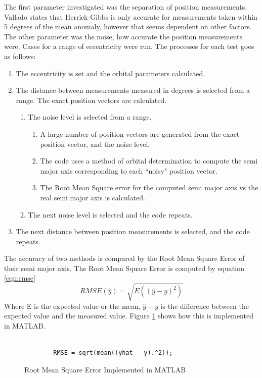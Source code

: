 \documentclass[12pt]{article}
\begin{document}
	The first parameter investigated was the separation of position measurements.  Vallado\cite{vallado2007fundamentals} states that Herrick-Gibbs is only accurate for measurements taken within 5 degrees of the mean anomaly, however that seems dependent on other factors. The other parameter was the noise, how accurate the position measurements were. Cases for a range of eccentricity were run. The processes for each test goes as follows:
	\begin{enumerate}
		\item The eccentricity is set and the orbital parameters calculated.
		\item The distance between measurements measured in degrees is selected from a range. The exact position vectors are calculated.
		\begin{enumerate}
			\item The noise level is selected from a range. 
			\begin{enumerate}
				\item A large number of position vectors are generated from the exact position vector, and the noise level.
				\item The code uses a method of orbital determination to compute the semi major axis corresponding to each ``noisy" position vector. 
				\item The Root Mean Square error for the computed semi major axis vs the real semi major axis is calculated. 

			\end{enumerate}
				\item The next noise level is selected and the code repeats.
		\end{enumerate}
		\item The next distance between position measurements is selected, and the code repeats.
	\end{enumerate}

	The accuracy of two methods is compared by the Root Mean Square Error of their semi major axis. The Root Mean Square Error is computed by equation \ref{eqn:rmse}
	\begin{equation}
	RMSE(\hat{y})=\sqrt{E\left(\left(\hat{y}-y\right)^2\right)}
	\label{eqn:rmse}
	\end{equation}
	Where E is the expected value or the mean, $\hat{y}-y$ is the difference between the expected value and the measured value. 
	Figure \ref{fig:RMS_MATLAB} shows how this is implemented in MATLAB. 
		\begin{figure}[H]
		\begin{lstlisting}
		
		RMSE = sqrt(mean((yhat - y).^2));
		\end{lstlisting}
		\caption{Root Mean Square Error Implemented in MATLAB}
		\label{fig:RMS_MATLAB}
	\end{figure}
	
\end{document}

